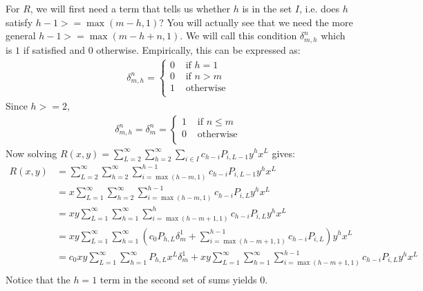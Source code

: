 	For $R$, we will first need a term that tells us whether $h$ is in the set $I$, i.e. does $h$ satisfy $h-1>=\max(m-h, 1)$? You will actually see that we need the more general $h-1>=\max(m-h+n, 1)$. We will call this condition $\delta_{m, h}^n$ which is $1$ if satisfied and $0$ otherwise. Empirically, this can be expressed as:
	\begin{align}
		\delta_{m, h}^n = \begin{cases}
			0 & \text{ if } h = 1 \\
			0 & \text{ if } n > m \\
			1 & \text{ otherwise } \\
		\end{cases}
	\end{align}
	Since $h >=2$,
	\begin{align}
		\delta_{m, h}^n = \delta_m^n = \begin{cases}
			1 & \text{ if } n \le m\\
			0 & \text{ otherwise } \\
		\end{cases}
	\end{align}
	Now solving $R(x, y)= \sum_{L=2}^\infty\sum_{h=2}^\infty\sum_{i\in I} c_{h-i}P_{i, L-1}y^hx^L$ gives:
	\begin{align}
		R(x, y) &= \sum_{L=2}^\infty\sum_{h=2}^\infty\sum_{i=\max(h-m, 1)}^{h-1} c_{h-i}P_{i, L-1}y^hx^L\\
		&= x \sum_{L=1}^\infty\sum_{h=2}^\infty\sum_{i=\max(h-m, 1)}^{h-1} c_{h-i}P_{i, L}y^hx^L\\
		&= xy \sum_{L=1}^\infty\sum_{h=1}^\infty\sum_{i=\max(h-m+1, 1)}^{h} c_{h-i}P_{i, L}y^hx^L\\
		&= xy \sum_{L=1}^\infty\sum_{h=1}^\infty\left(c_0P_{h, L}\delta_m^1 + \sum_{i=\max(h-m+1, 1)}^{h-1} c_{h-i}P_{i, L}\right)y^hx^L\\
		&= c_0xy \sum_{L=1}^\infty\sum_{h=1}^\infty P_{h, L}x^L\delta_m^1 + xy \sum_{L=1}^\infty\sum_{h=1}^\infty\sum_{i=\max(h-m+1, 1)}^{h-1} c_{h-i}P_{i, L}y^hx^L\\
	\end{align}
	Notice that the $h=1$ term in the second set of sums yields 0.
